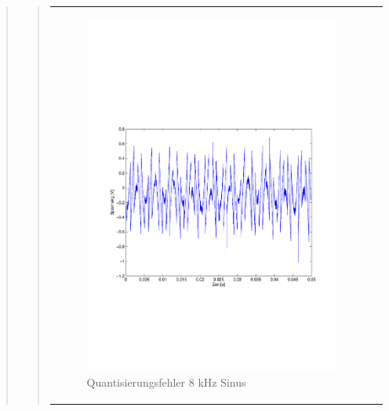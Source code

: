 \begin{quote}
\begin{quote}
\begin{center}
\begin{tabular}{ll}
            \hspace{-4cm}
                \begin{minipage}{0.6\textwidth}
                    \begin{figure}[H]
                        \includegraphics[scale=0.5, trim = 16mm 70mm 16mm 85mm, clip]
                                        {Bilder/8kHz_sin_Quantisierungsfehler}
                          \caption{Quantisierungsfehler 8 kHz Sinus}
                          \label{fig:QuantErr 8 kHz Sinus}
                    \end{figure}
                \end{minipage}
                

\end{tabular}
\end{center}
\end{quote}
\end{quote}
